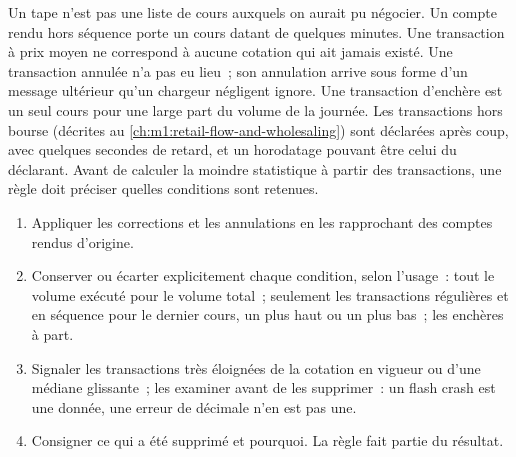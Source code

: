 Un tape n'est pas une liste de cours auxquels on aurait pu négocier. Un
compte rendu hors séquence porte un cours datant de quelques minutes. Une
transaction à prix moyen ne correspond à aucune cotation qui ait jamais existé. Une transaction annulée n'a pas eu lieu~;
son annulation arrive sous forme d'un message ultérieur qu'un chargeur négligent ignore.
Une transaction d'enchère est un seul cours pour une large part du volume de la journée. Les transactions hors bourse
(décrites au \cref{ch:m1:retail-flow-and-wholesaling}) sont déclarées après
coup, avec quelques secondes de retard, et un horodatage pouvant être celui du déclarant.
Avant de calculer la moindre statistique à partir des transactions, une règle doit préciser quelles
conditions sont retenues.

\begin{method}\label{met:m1:reading-market-data:clean}
\begin{enumerate}
\item Appliquer les corrections et les annulations en les rapprochant des
comptes rendus d'origine.
\item Conserver ou écarter explicitement chaque condition, selon l'usage~: tout le volume exécuté
pour le volume total~; seulement les transactions régulières et en séquence pour le
dernier cours, un plus haut ou un plus bas~; les enchères à part.
\item Signaler les transactions très éloignées de la cotation en vigueur ou d'une médiane glissante~;
les examiner avant de les supprimer~: un flash crash est une donnée, une erreur de décimale n'en est pas une.
\item Consigner ce qui a été supprimé et pourquoi. La règle fait partie du résultat.
\end{enumerate}
\end{method}

